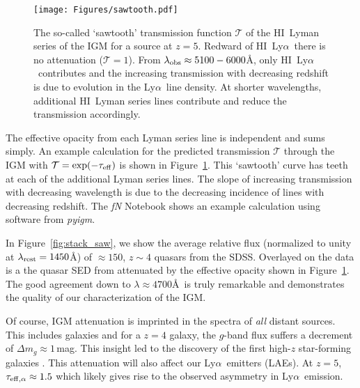 \documentclass[graybox]{svmult}
\newcommand{\HI}{H{\sc I}}
\def\lya{Ly$\alpha$}
\begin{document}
%
\begin{figure}[ht]
\sidecaption
\texttt{[image: Figures/sawtooth.pdf]}
%
%
\caption{The so-called `sawtooth' transmission function 
$\mathcal{T}$ of the
\HI\ Lyman series of the IGM for a source at $z=5$.
Redward of \HI\ \lya\ there is no attenuation
($\mathcal{T} = 1$).  From $\lambda_{\rm obs} \approx 5100-6000$\AA,
only \HI\ \lya\ contributes and the increasing transmission
with decreasing redshift is due to evolution in the \lya\ line density.
At shorter wavelengths, additional \HI\ Lyman series lines
contribute and reduce the transmission accordingly.
}
\label{fig:sawtooth}       %
\end{figure}

The effective opacity from each Lyman series line 
is independent and sums simply.  An example calculation for the
predicted transmission $\mathcal{T}$ through the IGM
with $\mathcal{T} = \exp(-\tau_{\rm eff})$ is
shown in Figure~\ref{fig:sawtooth}.
This `sawtooth' curve has teeth at each of the additional
Lyman series lines.  The slope of increasing transmission
with decreasing wavelength is due to the decreasing 
incidence of lines with decreasing redshift.
The {\it fN} Notebook shows an example calculation using
software from {\it pyigm}.

In Figure~\ref{fig:stack_saw}, we show the average 
relative flux (normalized to unity at $\lambda_{\rm rest} = 1450$\AA)
of $\approx 150$, $z \sim 4$ quasars from the SDSS.
Overlayed on the data is a the quasar SED from 
\cite{telfer02} attenuated by the effective opacity
shown in Figure~\ref{fig:sawtooth}.
The good agreement down to $\lambda \approx 4700$\AA\
is truly remarkable and demonstrates the quality of our
characterization of the IGM.

Of course, IGM attenuation
is imprinted in the spectra of {\it all} distant sources.
This includes galaxies and
for a $z=4$ galaxy, the $g$-band flux suffers a decrement
of $\Delta m_g \approx 1$\,mag.
This insight  led to the discovery
of the first high-$z$ star-forming galaxies 
\cite[]{mad95,sgp+96,lkg+97}.
This attenuation will also affect our \lya\ emitters (LAEs).
At $z=5$, $\tau_{\rm eff, \alpha} \approx 1.5$ 
which likely gives rise to the observed 
asymmetry in \lya\ emission. 
\end{document}
